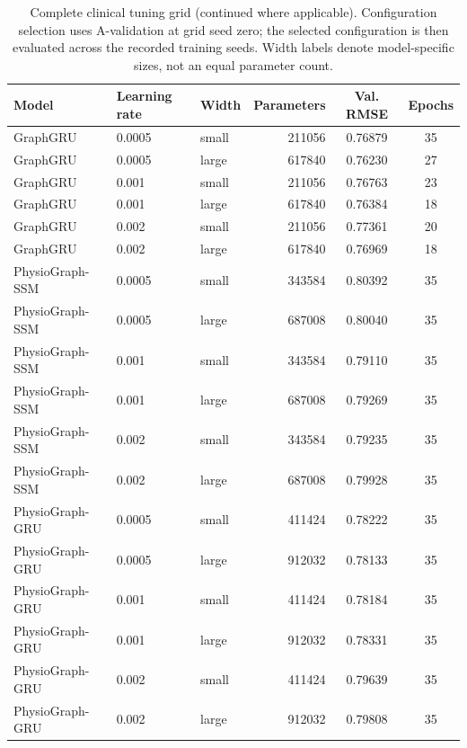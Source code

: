 \clearpage
\begin{table}[tbp]
\centering
\caption{Complete clinical tuning grid (continued where applicable). Configuration selection uses A-validation at grid seed zero; the selected configuration is then evaluated across the recorded training seeds. Width labels denote model-specific sizes, not an equal parameter count.}\label{tab:grid36}
\small\setlength{\tabcolsep}{4pt}
\begin{tabular}{lllrcc}
\toprule
Model 
& Learning rate 
& Width 
& Parameters 
& Val. RMSE 
& Epochs 
\\
\midrule
GraphGRU 
& 0.0005 
& small 
& 211056 
& 0.76879 
& 35 
\\
GraphGRU 
& 0.0005 
& large 
& 617840 
& 0.76230 
& 27 
\\
GraphGRU 
& 0.001 
& small 
& 211056 
& 0.76763 
& 23 
\\
GraphGRU 
& 0.001 
& large 
& 617840 
& 0.76384 
& 18 
\\
GraphGRU 
& 0.002 
& small 
& 211056 
& 0.77361 
& 20 
\\
GraphGRU 
& 0.002 
& large 
& 617840 
& 0.76969 
& 18 
\\
PhysioGraph-SSM 
& 0.0005 
& small 
& 343584 
& 0.80392 
& 35 
\\
PhysioGraph-SSM 
& 0.0005 
& large 
& 687008 
& 0.80040 
& 35 
\\
PhysioGraph-SSM 
& 0.001 
& small 
& 343584 
& 0.79110 
& 35 
\\
PhysioGraph-SSM 
& 0.001 
& large 
& 687008 
& 0.79269 
& 35 
\\
PhysioGraph-SSM 
& 0.002 
& small 
& 343584 
& 0.79235 
& 35 
\\
PhysioGraph-SSM 
& 0.002 
& large 
& 687008 
& 0.79928 
& 35 
\\
PhysioGraph-GRU 
& 0.0005 
& small 
& 411424 
& 0.78222 
& 35 
\\
PhysioGraph-GRU 
& 0.0005 
& large 
& 912032 
& 0.78133 
& 35 
\\
PhysioGraph-GRU 
& 0.001 
& small 
& 411424 
& 0.78184 
& 35 
\\
PhysioGraph-GRU 
& 0.001 
& large 
& 912032 
& 0.78331 
& 35 
\\
PhysioGraph-GRU 
& 0.002 
& small 
& 411424 
& 0.79639 
& 35 
\\
PhysioGraph-GRU 
& 0.002 
& large 
& 912032 
& 0.79808 
& 35 
\\
\bottomrule
\end{tabular}
\end{table}

